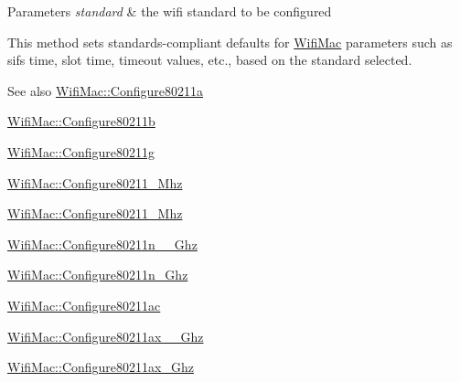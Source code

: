 \begin{DoxyParams}{Parameters}
{\em standard} & the wifi standard to be configured\\
\hline
\end{DoxyParams}
This method sets standards-\/compliant defaults for \hyperlink{classns3_1_1WifiMac}{Wifi\+Mac} parameters such as sifs time, slot time, timeout values, etc., based on the standard selected.

\begin{DoxySeeAlso}{See also}
\hyperlink{classns3_1_1WifiMac_a943b3ecf94ab4a55fab61b36d2ccd1ea}{Wifi\+Mac\+::\+Configure80211a} 

\hyperlink{classns3_1_1WifiMac_a71071ac76d23188d7709bace54639998}{Wifi\+Mac\+::\+Configure80211b} 

\hyperlink{classns3_1_1WifiMac_a827eace56408e746fd89edbec397f6c9}{Wifi\+Mac\+::\+Configure80211g} 

\hyperlink{classns3_1_1WifiMac_a9c463197da57525dbb5ca3597bf3723f}{Wifi\+Mac\+::\+Configure80211\+\_\+Mhz} 

\hyperlink{classns3_1_1WifiMac_acf8a2b425758ad26ffbe32068156a4a0}{Wifi\+Mac\+::\+Configure80211\+\_\+Mhz} 

\hyperlink{classns3_1_1WifiMac_ab263ee8ba60441bf96a9c9debb0c99e6}{Wifi\+Mac\+::\+Configure80211n\+\_\+\_\+Ghz} 

\hyperlink{classns3_1_1WifiMac_ae1407b7d661b9a712bdd95cffbef1e0f}{Wifi\+Mac\+::\+Configure80211n\+\_\+Ghz} 

\hyperlink{classns3_1_1WifiMac_ae5ebb39bedd14fbff677b5948d6801ab}{Wifi\+Mac\+::\+Configure80211ac} 

\hyperlink{classns3_1_1WifiMac_a244d95e24bc602959e5ef2214d635115}{Wifi\+Mac\+::\+Configure80211ax\+\_\+\_\+Ghz} 

\hyperlink{classns3_1_1WifiMac_af0c5ea359558e4a6c83dc91c570f7488}{Wifi\+Mac\+::\+Configure80211ax\+\_\+Ghz} 
\end{DoxySeeAlso}

